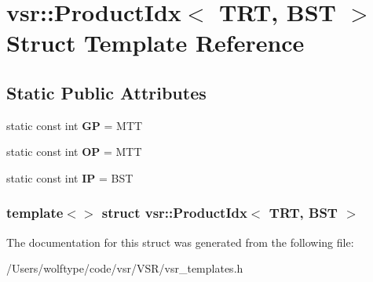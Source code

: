 \hypertarget{structvsr_1_1_product_idx_3_01_t_r_t_00_01_b_s_t_01_4}{\section{vsr\-:\-:Product\-Idx$<$ T\-R\-T, B\-S\-T $>$ Struct Template Reference}
\label{structvsr_1_1_product_idx_3_01_t_r_t_00_01_b_s_t_01_4}
}
\subsection*{Static Public Attributes}
\begin{DoxyCompactItemize}
\item 
\hypertarget{structvsr_1_1_product_idx_3_01_t_r_t_00_01_b_s_t_01_4_afefcf90d346b2e2a97181c243ed9b05f}{static const int {\bfseries G\-P} = M\-T\-T}\label{structvsr_1_1_product_idx_3_01_t_r_t_00_01_b_s_t_01_4_afefcf90d346b2e2a97181c243ed9b05f}

\item 
\hypertarget{structvsr_1_1_product_idx_3_01_t_r_t_00_01_b_s_t_01_4_a677bc5bc862eb8dedf1ea62a4f18fe52}{static const int {\bfseries O\-P} = M\-T\-T}\label{structvsr_1_1_product_idx_3_01_t_r_t_00_01_b_s_t_01_4_a677bc5bc862eb8dedf1ea62a4f18fe52}

\item 
\hypertarget{structvsr_1_1_product_idx_3_01_t_r_t_00_01_b_s_t_01_4_a61db0a019e6ba5ec95e4eab815fe1dd8}{static const int {\bfseries I\-P} = B\-S\-T}\label{structvsr_1_1_product_idx_3_01_t_r_t_00_01_b_s_t_01_4_a61db0a019e6ba5ec95e4eab815fe1dd8}

\end{DoxyCompactItemize}
\subsubsection*{template$<$$>$ struct vsr\-::\-Product\-Idx$<$ T\-R\-T, B\-S\-T $>$}



The documentation for this struct was generated from the following file\-:\begin{DoxyCompactItemize}
\item 
/\-Users/wolftype/code/vsr/\-V\-S\-R/vsr\-\_\-templates.\-h\end{DoxyCompactItemize}
